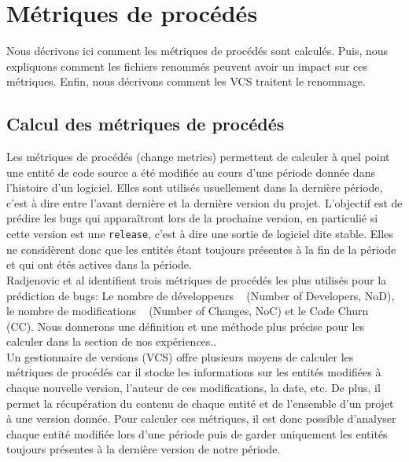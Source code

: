 \section{Métriques de procédés}
\label{sec:metriques}

Nous décrivons ici comment les métriques de procédés sont calculés. Puis, nous expliquons comment les fichiers renommés peuvent avoir un impact sur ces métriques. Enfin, nous décrivons comment les VCS traitent le renommage.\\

\subsection{Calcul des métriques de procédés}

Les métriques de procédés (change metrics) permettent de calculer à quel point une entité de code source a été modifiée au cours d'une période donnée dans l'histoire d'un logiciel. Elles sont utilisés usuellement dans la dernière période, c'est à dire entre l'avant dernière et la dernière version du projet. L'objectif est de prédire les bugs qui apparaîtront lors de la prochaine version, en particulié si cette version est une \texttt{release}, c'est à dire une sortie de logiciel dite stable. Elles ne considèrent donc que les entités étant toujours présentes à la fin de la période et qui ont étés actives dans la période.\\
Radjenovic et al \cite{radjenovic_software_2013} identifient trois métriques de procédés les plus utilisés pour la prédiction de bugs: Le nombre de développeurs ~\cite{weyuker_too_2008} (Number of Developers, NoD), le nombre de modifications ~\cite{graves_predicting_2000} (Number of Changes, NoC) et le Code Churn ~\cite{munson_code_1998} (CC). Nous donnerons une définition et une méthode plus précise pour les calculer dans la section de nos expériences..\\

Un gestionnaire de versions (VCS) offre plusieurs moyens de calculer les métriques de procédés car il stocke les informations sur les entités modifiées à chaque nouvelle version, l'auteur de ces modifications, la date, etc. De plus, il permet la récupération du contenu de chaque entité et de l'ensemble d'un projet à une version donnée. Pour calculer ces métriques, il est donc possible d'analyser chaque entité modifiée lors d'une période puis de garder uniquement les entités toujours présentes à la dernière version de notre période.\\


